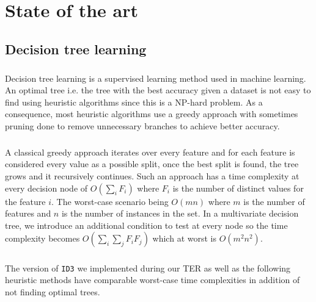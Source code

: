 \documentclass[12pt]{report}
\theoremstyle{definition}
\theoremstyle{definition}
\theoremstyle{definition}
\begin{document}
\chapter{State of the art}
\section{Decision tree learning} 
\paragraph{} Decision tree learning is a supervised learning method used in machine learning. An optimal tree i.e.
the tree with the best accuracy given a dataset is not easy to find using heuristic algorithms since this is
a NP-hard problem. As a consequence, most heuristic algorithms use a greedy approach with sometimes pruning
done to remove unnecessary branches to achieve better accuracy.

\paragraph{} A classical greedy approach iterates over every feature and for each feature is considered every
value as a possible split, once the best split is found, the tree grows and it recursively continues.
Such an approach has a time complexity at every decision node of $O(\sum_{i}^{}F_i)$ where $F_i$ is the number
of distinct values for the feature $i$. The worst-case scenario being $O(mn)$ where $m$ is the number of
features and $n$ is the number of instances in the set. In a multivariate decision tree, we introduce an
additional condition to test at every node so the time complexity becomes $O(\sum_{i}\sum_{j}F_iF_j)$ which at
worst is $O(m^2n^2)$.

\paragraph{} The version of \texttt{ID3} we implemented during our TER as well as the following heuristic methods have
comparable worst-case time complexities in addition of not finding optimal trees.

\newpage
\end{document}
